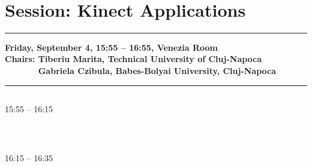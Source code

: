             
            \\ 


\section{{\bf \large Session: %
Kinect Applications
}} \vspace{-15pt} %
\noindent\rule{\textwidth}{0.4pt} \nopagebreak
{\bf  
Friday, September 4, 15:55 -- 16:55, Venezia Room
} \\ \nopagebreak
{\bf  Chairs: 
Tiberiu Marita, Technical University of Cluj-Napoca
} \\ \nopagebreak 
{\bf  \textcolor{white}{Chairs:} 
Gabriela Czibula, Babes-Bolyai University, Cluj-Napoca
} \\ \nopagebreak 
\noindent\rule{\textwidth}{0.4pt} \nopagebreak

\vspace*{-36pt}\subsection[ 
    	   {\bf Body gesture validation using multi-dimensional dynamic time warping on Kinect data
           } \\
           {\it Lorenzo Patras, Ion Giosan, Sergiu Nedevschi
           }
	]
	    {
            }
	    15:55 -- 16:15 \nopagebreak

            
            \\ 
\pagebreak
\vspace*{-36pt}\subsection[ 
    	   {\bf Instance Based Learning Approaches for predicting the height of human skeletons
           } \\
           {\it Vlad-Sebastian Ionescu, Ioan-Gabriel Mircea, Diana-Lucia Miholca, Gabriela Czibula
           }
	]
	    {
            }
	    16:15 -- 16:35 \nopagebreak


